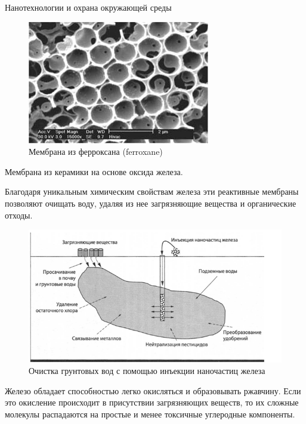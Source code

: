 \documentclass[_Venture_p3.tex]{subfiles}
\begin{document}
\begin{frame}{Нанотехнологии и охрана окружающей среды}
\begin{figure}
	\centering
	\includegraphics[scale=.7]{img/membrane_ferroxane}
	\caption{Мембрана из ферроксана (ferroxane) }
\end{figure}
Мембрана из керамики на основе оксида железа. 

Благодаря уникальным химическим свойствам железа эти реактивные мембраны позволяют очищать воду, удаляя из нее загрязняющие вещества и органические отходы.
\end{frame}

\begin{frame}
\begin{figure}
	\centering
	\includegraphics[scale=.7]{img/cleaning_environment}
	\caption{Очистка грунтовых вод с помощью инъекции наночастиц железа}
\end{figure}
\end{frame}

\begin{frame}
Железо обладает способностью легко окисляться и образовывать ржавчину. Если это окисление происходит в присутствии загрязняющих веществ, то их сложные молекулы распадаются на простые и менее токсичные углеродные компоненты.
\end{frame}
\end{document}
